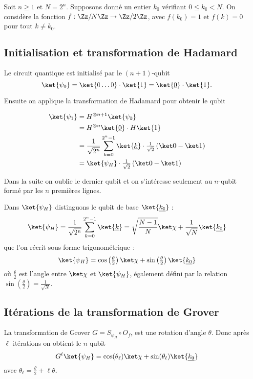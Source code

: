 \documentclass[11pt,class=report,crop=false]{standalone}
\begin{document}
Soit $n\ge1$ et $N=2^n$. 
Supposons donné un entier $k_0$ vérifiant $0\le k_0 < N$.
On considère la fonction $f : \Zz/N\Zz \to \Zz/2\Zz$, avec $f(k_0)=1$ et
$f(k)=0$ pour tout $k\neq k_0$.

\subsection{Initialisation et transformation de Hadamard}

Le circuit quantique est initialisé par le $(n+1)$-qubit
$$\ket{\psi_0} = \ket{0\ldots0} \cdot \ket{1} 
= \ket{\underline{0}} \cdot \ket{1}.$$

Ensuite on applique la transformation de Hadamard pour obtenir le qubit 

\begin{align*}
\ket{\psi_1} 
  &= H^{\otimes n+1} \ket{\psi_0} \\
  &= H^{\otimes n}\ket{\underline{0}} \cdot H\ket{1} \\
  &= \frac{1}{\sqrt{2^n}} \sum_{k=0}^{2^n-1} \ket{\underline k} \cdot \tfrac{1}{\sqrt{2}}\left(\ket0 - \ket1\right) \\
  &= \ket{\psi_H} \cdot \tfrac{1}{\sqrt{2}}\left(\ket0 - \ket1\right)
\end{align*}

Dans la suite on oublie le dernier qubit et on s'intéresse seulement au $n$-qubit formé par les $n$ premières lignes.

Dans $\ket{\psi_H}$ distinguons le qubit de base $\ket{\underline{k_0}}$ :
$$\ket{\psi_H} = \frac{1}{\sqrt{2^n}} \sum_{k=0}^{2^n-1} \ket{\underline{k}}
= \sqrt{\frac{N-1}{N}} \ket\chi + \frac{1}{\sqrt{N}} \ket{\underline{k_0}}$$
que l'on récrit sous forme trigonométrique :
$$\ket{\psi_H} = \cos\left(\tfrac\theta2\right) \ket\chi + \sin\left(\tfrac\theta2\right) \ket{\underline{k_0}}$$
où $\frac\theta2$ est l'angle entre $\ket\chi$ et $\ket{\psi_H}$, également défini par la relation $\sin\left(\frac\theta2\right)=\frac{1}{\sqrt{N}}$.

\subsection{Itérations de la transformation de Grover}

La transformation de Grover $G = S_{\psi_H} \circ O_f$, est une rotation d'angle $\theta$. Donc après $\ell$ itérations on obtient le $n$-qubit
$$G^\ell\ket{\psi_H} = \cos(\theta_\ell) \ket\chi + \sin(\theta_\ell) \ket{\underline{k_0}}$$
avec $\theta_\ell = \frac\theta2+\ell\theta$.
\end{document}
